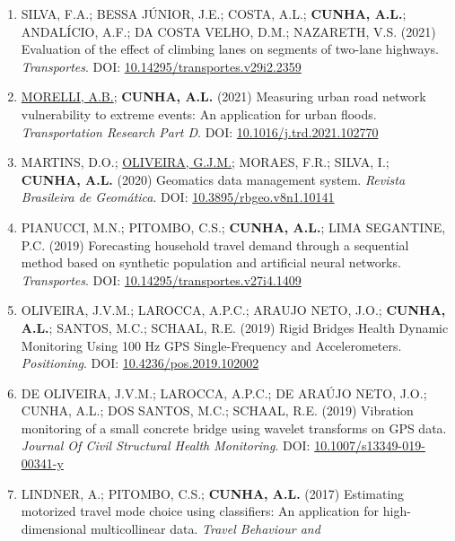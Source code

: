 \documentclass[
  10pt,
  a4paper,
  DIV=11,
  numbers=noendperiod]{scrartcl}
\begin{document}
\begin{enumerate}
  \ul{MORELLI, A. B.}; \textbf{CUNHA, A.L.} (2021) Assessing
  vulnerabilities in transport networks: a graph-theoretic approach.
  \emph{Transportes}. DOI:
  \href{https://doi.org/10.14295/transportes.v29i1.2250}{10.14295/transportes.v29i1.2250}
\item
  SILVA, F.A.; BESSA JÚNIOR, J.E.; COSTA, A.L.; \textbf{CUNHA, A.L.};
  ANDALÍCIO, A.F.; DA COSTA VELHO, D.M.; NAZARETH, V.S. (2021)
  Evaluation of the effect of climbing lanes on segments of two-lane
  highways. \emph{Transportes}. DOI:
  \href{https://doi.org/10.14295/transportes.v29i2.2359}{10.14295/transportes.v29i2.2359}
\item
  \ul{MORELLI, A.B.}; \textbf{CUNHA, A.L.} (2021) Measuring urban road
  network vulnerability to extreme events: An application for urban
  floods. \emph{Transportation Research Part D}. DOI:
  \href{https://doi.org/10.1016/j.trd.2021.102770}{10.1016/j.trd.2021.102770}
\item
  MARTINS, D.O.; \ul{OLIVEIRA, G.J.M.}; MORAES, F.R.; SILVA, I.;
  \textbf{CUNHA, A.L.} (2020) Geomatics data management system.
  \emph{Revista Brasileira de Geomática}. DOI:
  \href{https://doi.org/10.3895/rbgeo.v8n1.10141}{10.3895/rbgeo.v8n1.10141}
\item
  PIANUCCI, M.N.; PITOMBO, C.S.; \textbf{CUNHA, A.L.}; LIMA SEGANTINE,
  P.C. (2019) Forecasting household travel demand through a sequential
  method based on synthetic population and artificial neural networks.
  \emph{Transportes}. DOI:
  \href{https://doi.org/10.14295/transportes.v27i4.1409}{10.14295/transportes.v27i4.1409}
\item
  OLIVEIRA, J.V.M.; LAROCCA, A.P.C.; ARAUJO NETO, J.O.; \textbf{CUNHA,
  A.L.}; SANTOS, M.C.; SCHAAL, R.E. (2019) Rigid Bridges Health Dynamic
  Monitoring Using 100 Hz GPS Single-Frequency and Accelerometers.
  \emph{Positioning}. DOI:
  \href{https://doi.org/10.4236/pos.2019.102002}{10.4236/pos.2019.102002}
\item
  DE OLIVEIRA, J.V.M.; LAROCCA, A.P.C.; DE ARAÚJO NETO, J.O.; CUNHA,
  A.L.; DOS SANTOS, M.C.; SCHAAL, R.E. (2019) Vibration monitoring of a
  small concrete bridge using wavelet transforms on GPS data.
  \emph{Journal Of Civil Structural Health Monitoring}. DOI:
  \href{https://doi.org/10.1007/s13349-019-00341-y}{10.1007/s13349-019-00341-y}
\item
  LINDNER, A.; PITOMBO, C.S.; \textbf{CUNHA, A.L.} (2017) Estimating
  motorized travel mode choice using classifiers: An application for
  high-dimensional multicollinear data. \emph{Travel Behaviour and
}
\end{enumerate}
\end{document}
